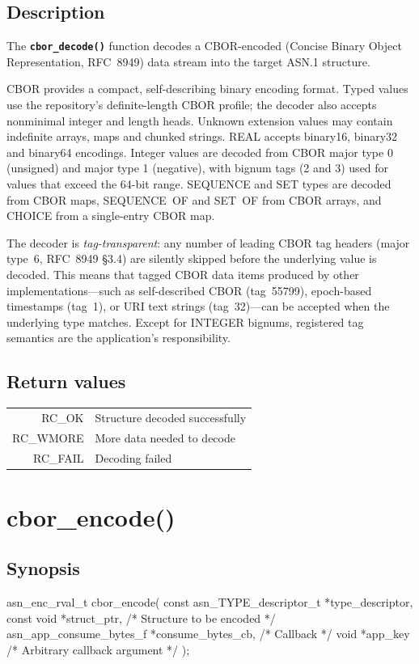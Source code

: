 \documentclass[english,oneside,12pt]{book}
\newcommand{\apisection}[2]{\clearpage\section{\label{#1}#2}}
\newcommand{\code}[1]{\texttt{\textbf{\lstinline{#1}}}}
\begin{document}
\subsection*{Description}

The \code{cbor_decode()} function decodes a CBOR-encoded (Concise Binary
Object Representation, RFC~8949) data stream into the target ASN.1 structure.

CBOR provides a compact, self-describing binary encoding format.
Typed values use the repository's definite-length CBOR profile; the decoder
also accepts nonminimal integer and length heads. Unknown extension values
may contain indefinite arrays, maps and chunked strings. REAL accepts
binary16, binary32 and binary64 encodings. Integer values are decoded from
CBOR major type 0 (unsigned) and
major type 1 (negative), with bignum tags (2 and 3) used for values that
exceed the 64-bit range. SEQUENCE and SET types are decoded from CBOR maps,
SEQUENCE~OF and SET~OF from CBOR arrays, and CHOICE from a single-entry
CBOR map.

The decoder is \emph{tag-transparent}: any number of leading CBOR tag headers
(major type~6, RFC~8949 \S3.4) are silently skipped before the underlying
value is decoded. This means that tagged CBOR data items produced by other
implementations---such as self-described CBOR (tag~55799), epoch-based
timestamps (tag~1), or URI text strings (tag~32)---can be accepted when the
underlying type matches. Except for INTEGER bignums, registered tag semantics
are the application's responsibility.

\subsection*{Return values}

\begin{tabular}[h!]{rl}
RC\_OK & Structure decoded successfully \\
RC\_WMORE & More data needed to decode \\
RC\_FAIL & Decoding failed
\end{tabular}

\apisection{sec:cbor_encode}{cbor\_encode()}

\subsection*{Synopsis}
\begin{signature}
asn_enc_rval_t cbor_encode(
    const asn_TYPE_descriptor_t *type_descriptor,
    const void *struct_ptr,             /* Structure to be encoded */
    asn_app_consume_bytes_f *consume_bytes_cb, /* Callback */
    void *app_key                       /* Arbitrary callback argument */
);
\end{signature}
\end{document}
